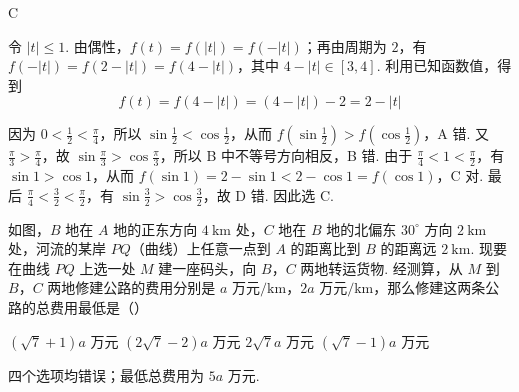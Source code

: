 \begin{answer}
C
\end{answer}

\begin{solution}
令 \(|t|\leq1\). 由偶性，\(f(t)=f(|t|)=f(-|t|)\)；再由周期为 \(2\)，有
\(f(-|t|)=f(2-|t|)=f(4-|t|)\)，其中 \(4-|t|\in[3,4]\). 利用已知函数值，得到
\[
f(t)=f(4-|t|)=(4-|t|)-2=2-|t|
\]

因为 \(0<\frac12<\frac\pi4\)，所以 \(\sin\frac12<\cos\frac12\)，从而 \(f(\sin\frac12)>f(\cos\frac12)\)，A 错. 又 \(\frac\pi3>\frac\pi4\)，故 \(\sin\frac\pi3>\cos\frac\pi3\)，所以 B 中不等号方向相反，B 错. 由于 \(\frac\pi4<1<\frac\pi2\)，有 \(\sin1>\cos1\)，从而
\(f(\sin1)=2-\sin1<2-\cos1=f(\cos1)\)，C 对. 最后 \(\frac\pi4<\frac32<\frac\pi2\)，有 \(\sin\frac32>\cos\frac32\)，故 D 错. 因此选 C.
\end{solution}

\begin{problem}
如图，\(B\) 地在 \(A\) 地的正东方向 \(4\mathrm{~km}\) 处，\(C\) 地在 \(B\) 地的北偏东 \(30^{\circ}\) 方向 \(2\mathrm{~km}\) 处，河流的某岸 \(PQ\)（曲线）上任意一点到 \(A\) 的距离比到 \(B\) 的距离远 \(2\mathrm{~km}\). 现要在曲线 \(PQ\) 上选一处 \(M\) 建一座码头，向 \(B\)，\(C\) 两地转运货物. 经测算，从 \(M\) 到 \(B\)，\(C\) 两地修建公路的费用分别是 \(a\text{ 万元}/\mathrm{km}\)，\(2a\text{ 万元}/\mathrm{km}\)，那么修建这两条公路的总费用最低是（\quad）


\choices
    {\((\sqrt{7} + 1)a\text{ 万元}\)}
    {\((2\sqrt{7} - 2)a\text{ 万元}\)}
    {\(2\sqrt{7}a\text{ 万元}\)}
    {\((\sqrt{7} - 1)a\text{ 万元}\)}
\end{problem}

\begin{answer}
四个选项均错误；最低总费用为 \(5a\text{ 万元}\).
\end{answer}

